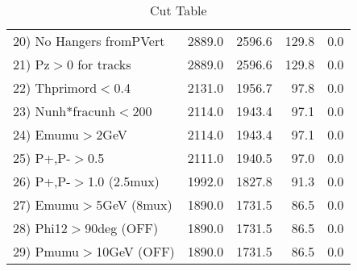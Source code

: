 \begin{table}[h!]
\begin{tabular}{||l||r|r|r|r||}
 20) No Hangers fromPVert &      2889.0 &      2596.6 &       129.8 &         0.0 \\
 21) Pz$>$0 for tracks    &      2889.0 &      2596.6 &       129.8 &         0.0 \\
 22) Thprimord$<$0.4      &      2131.0 &      1956.7 &        97.8 &         0.0 \\
 23) Nunh*fracunh$<$200   &      2114.0 &      1943.4 &        97.1 &         0.0 \\
 24) Emumu$>$2GeV         &      2114.0 &      1943.4 &        97.1 &         0.0 \\
 25) P+,P-$>$0.5          &      2111.0 &      1940.5 &        97.0 &         0.0 \\
 26) P+,P-$>$1.0 (2.5mux) &      1992.0 &      1827.8 &        91.3 &         0.0 \\
 27) Emumu$>$5GeV  (8mux) &      1890.0 &      1731.5 &        86.5 &         0.0 \\
 28) Phi12$>$90deg  (OFF) &      1890.0 &      1731.5 &        86.5 &         0.0 \\
 29) Pmumu$>$10GeV  (OFF) &      1890.0 &      1731.5 &        86.5 &         0.0 \\
 \hline
 \hline
 \end{tabular}
 \caption{Cut Table \cohrp  }
 \label{tab-cut_crhop}
 \end{table}
